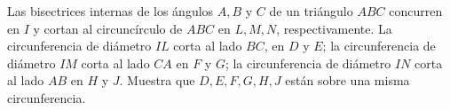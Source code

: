 Las bisectrices internas de los ángulos $A, B$ y $C$ de un triángulo $ABC$ concurren en $I$
y cortan al circuncírculo de $ABC$ en $L, M, N$, respectivamente. La circunferencia de
diámetro $IL$ corta al lado $BC$, en $D$ y $E$; la circunferencia de diámetro $IM$ corta al lado
$CA$ en $F$ y $G$; la circunferencia de diámetro $IN$ corta al lado $AB$ en $H$ y $J$. Muestra que
$D, E, F , G, H, J$ están sobre una misma circunferencia.